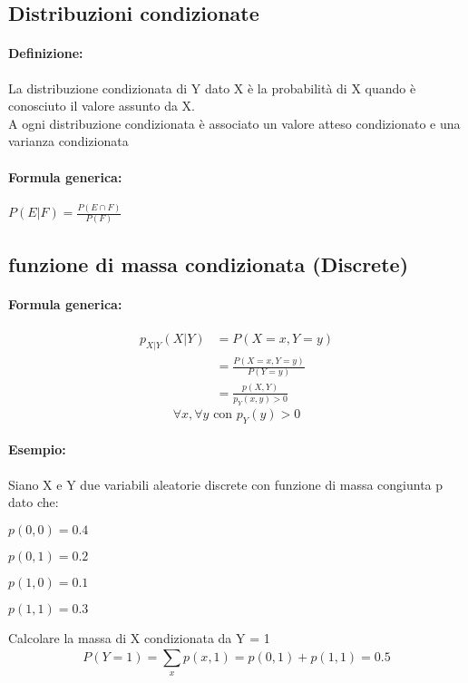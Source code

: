 \documentclass[]{article}
\newcommand{\definizione}{\paragraph{Definizione:}}
\newcommand{\formula}{\paragraph{Formula generica:}}
\begin{document}
    \newpage
    \subsection{Distribuzioni condizionate}
    \definizione La distribuzione condizionata di Y dato X è la probabilità di X quando è conosciuto il valore assunto da X. \\
    A ogni distribuzione condizionata è associato un valore atteso condizionato e una varianza condizionata
    \formula $P(E|F) = \frac{P(E \cap F)}{P(F)}$

    \subsection{funzione di massa condizionata (Discrete)}
    \formula
    \begin{equation*}
        \begin{split}
            p_{X|Y}(X | Y) & = P (X=x, Y=y) \\
            & = \frac{P(X=x, Y=y)}{P(Y=y)} \\
            & = \frac{p(X,Y)}{p_Y(x, y) > 0} 
        \end{split}
    \end{equation*}
    \[ \forall x, \forall y \text{ con } p_Y(y) > 0\]
    \linebreak[4]
    
    \paragraph{Esempio:} Siano X e Y due variabili aleatorie discrete con funzione di massa congiunta p dato che: 
    \begin{center}
        \begin{minipage}{0.2\textwidth}
            $p(0,0) = 0.4$
        \end{minipage}
        \begin{minipage}{0.2\textwidth}
            $p(0,1) = 0.2$
        \end{minipage}
        \begin{minipage}{0.2\textwidth}
            $p(1,0) = 0.1$
        \end{minipage}
        \begin{minipage}{0.2\textwidth}
            $p(1,1) = 0.3$
        \end{minipage}
    \end{center}
    Calcolare la massa di X condizionata da Y = 1
    \[ P(Y = 1) = \sum_{x}^{} p(x, 1) = p(0,1) + p(1,1) = 0.5 \]
\end{document}
